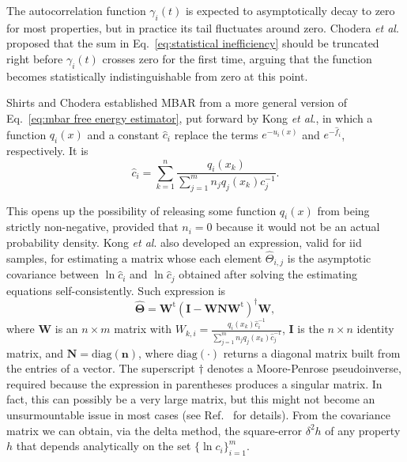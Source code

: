 \documentclass[aip,jcp,reprint,amsmath,amssymb]{revtex4-1}
\newcommand{\mt}[1]{\boldsymbol{\mathbf{#1}}}           %
\newcommand{\vt}[1]{\boldsymbol{\mathbf{#1}}}           %
\newcommand{\tr}[1]{#1^\text{t}}                        %
\begin{document}
The autocorrelation function $\gamma_i(t)$ is expected to asymptotically decay to zero for most properties, but in practice its tail fluctuates around zero. Chodera \textit{et al}.\cite{Chodera_2007} proposed that the sum in Eq.~\eqref{eq:statistical inefficiency} should be truncated right before $\gamma_i(t)$ crosses zero for the first time, arguing that the function becomes statistically indistinguishable from zero at this point.

Shirts and Chodera\cite{Shirts_2008} established MBAR from a more general version of Eq.~\eqref{eq:mbar free energy estimator}, put forward by Kong \textit{et al}.,\cite{Kong_2003} in which a function $q_i(x)$ and a constant $\hat c_i$ replace the terms $e^{-u_i(x)}$ and $e^{-\hat f_i}$, respectively. It is
\begin{equation}
\label{eq:mbar general estimator}
{\hat c}_i = \sum_{k=1}^n \frac{q_i(x_k)}{\sum_{j=1}^m n_j q_j(x_k) c_j^{-1}}.
\end{equation}
 
This opens up the possibility of releasing some function $q_i(x)$ from being strictly non-negative, provided that $n_i = 0$ because it would not be an actual probability density. Kong \textit{et al}.\cite{Kong_2003} also developed an expression, valid for iid samples, for estimating a matrix whose each element $\hat \Theta_{i,j}$ is the asymptotic covariance between $\ln \hat c_i$ and $\ln \hat c_j$ obtained after solving the estimating equations self-consistently. Such expression is
\begin{equation}
\label{eq:mbar covariance matrix}
\hat{\mt \Theta} = \tr{\mt W} (\mt I - {\mt W}{\mt N}\tr{\mt W})^\dag {\mt W},
\end{equation}
where $\mt W$ is an $n \times m$ matrix with $W_{k,i} = \frac{q_i(x_k) \hat c_i^{-1}}{\sum_{j=1}^m n_j q_j(x_k) \hat c_j^{-1}}$, $\mt I$ is the $n \times n$ identity matrix, and $\mt N = \text{diag}(\vt n)$, where $\text{diag}(\cdot)$ returns a diagonal matrix built from the entries of a vector. The superscript $\dag$ denotes a Moore-Penrose pseudoinverse, required because the expression in parentheses produces a singular matrix. In fact, this can possibly be a very large matrix, but this might not become an unsurmountable issue in most cases (see Ref.~ for details). From the covariance matrix we can obtain, via the delta method, the square-error $\delta^2 h$ of any property $h$ that depends analytically on the set $\{\ln c_i\}_{i=1}^m$.
 
\end{document}
